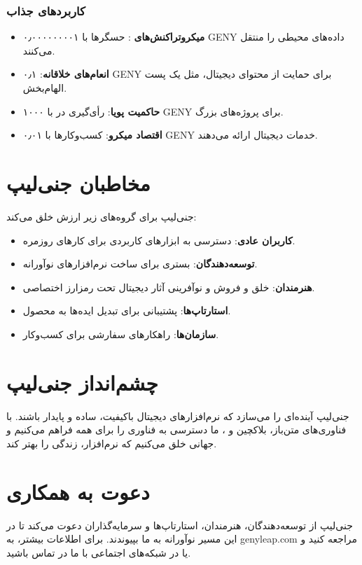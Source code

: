 \documentclass[a4paper,12pt,openany]{book}
\begin{document}
\subsection*{کاربردهای جذاب}
\begin{itemize}
    \item \textbf{میکروتراکنش‌های }: حسگرها با ۰٫۰۰۰۰۰۰۰۰۱ GENY داده‌های محیطی را منتقل می‌کنند.
    \item \textbf{انعام‌های خلاقانه}: ۰٫۱ GENY برای حمایت از محتوای دیجیتال، مثل یک پست الهام‌بخش.
    \item \textbf{حاکمیت پویا}: رأی‌گیری در  با ۱۰۰۰ GENY برای پروژه‌های بزرگ.
    \item \textbf{اقتصاد میکرو}: کسب‌وکارها با ۰٫۰۱ GENY خدمات دیجیتال ارائه می‌دهند.
\end{itemize}

\chapter{مخاطبان جنی‌لیپ}
جنی‌لیپ برای گروه‌های زیر ارزش خلق می‌کند:
\begin{itemize}
    \item \textbf{کاربران عادی}: دسترسی به ابزار‌های کاربردی برای کارهای روزمره.
    \item \textbf{توسعه‌دهندگان}: بستری برای ساخت نرم‌افزارهای نوآورانه.
    \item \textbf{هنرمندان}: خلق و فروش و نو‌آفرینی آثار دیجیتال تحت رمزارز اختصاصی.
    \item \textbf{استارتاپ‌ها}: پشتیبانی برای تبدیل ایده‌ها به محصول.
    \item \textbf{سازمان‌ها}: راهکارهای سفارشی برای کسب‌وکار.
\end{itemize}

\chapter{چشم‌انداز جنی‌لیپ}
جنی‌لیپ آینده‌ای را می‌سازد که نرم‌افزارهای دیجیتال باکیفیت، ساده و پایدار باشند. با فناوری‌های متن‌باز، بلاکچین و ، ما دسترسی به فناوری را برای همه فراهم می‌کنیم و جهانی خلق می‌کنیم که نرم‌افزار، زندگی را بهتر کند.

\chapter{دعوت به همکاری}
جنی‌لیپ از توسعه‌دهندگان، هنرمندان، استارتاپ‌ها و سرمایه‌گذاران دعوت می‌کند تا در این مسیر نوآورانه به ما بپیوندند. برای اطلاعات بیشتر، به genyleap.com مراجعه کنید و یا در شبکه‌های اجتماعی با ما در تماس باشید.
\end{document}
